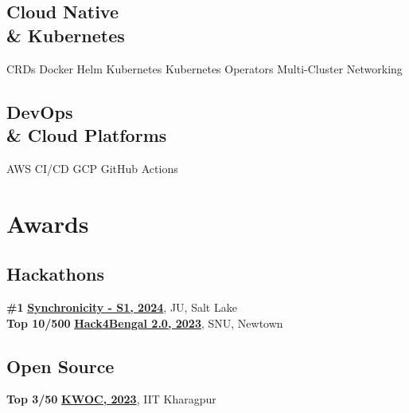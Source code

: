 \documentclass[]{deedy-resume-openfont}
\begin{document}
\begin{minipage}[t]{0.33\textwidth}
\vspace{10pt}

\subsection{Cloud Native \\ \& Kubernetes}
CRDs \textbullet{} Docker \textbullet{} Helm \textbullet{} Kubernetes \textbullet{} Kubernetes Operators \textbullet{} Multi-Cluster Networking

\vspace{10pt}

\subsection{DevOps \\ \& Cloud Platforms}
AWS \textbullet{} CI/CD \textbullet{} GCP \textbullet{} GitHub Actions


%
%

\sectionsep
\section{Awards}
\subsection{Hackathons}
\textbf{\textbullet{} \#1} \textbf{\href{https://certopus.com/c/efc67ee6e251433580e1568487bf43ba/}{Synchronicity - S1, 2024}}, JU, Salt Lake \\
\textbf{\textbullet{} Top 10/500} \textbf{\href{https://www.hack4bengal.tech/}{Hack4Bengal 2.0, 2023}}, SNU, Newtown \\[6pt]
\subsection{Open Source}
\textbf{\textbullet{} Top 3/50} \textbf{\href{https://github.com/kossiitkgp/public-files/blob/master/KWoC/2023-Certificates/Mentor/ani1609.pdf}{KWOC, 2023}}, IIT Kharagpur \\




%
%

\end{minipage} 
\hfill
\end{document}
